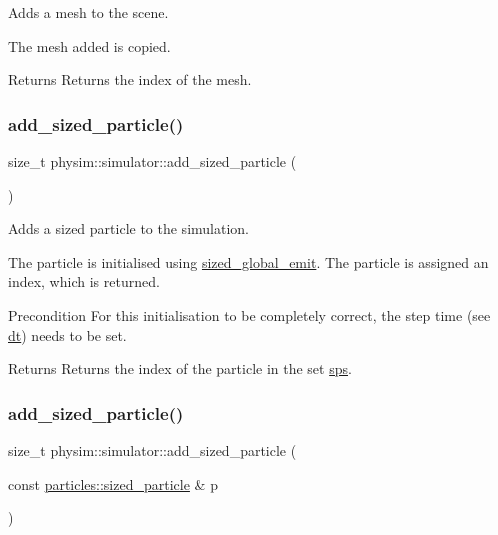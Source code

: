 Adds a mesh to the scene. 

The mesh added is copied. \begin{DoxyReturn}{Returns}
Returns the index of the mesh. 
\end{DoxyReturn}
\mbox{\label{classphysim_1_1simulator_ae36d99f98f5e470934eea0523ffca583}} 
\subsubsection{\texorpdfstring{add\+\_\+sized\+\_\+particle()}{add\_sized\_particle()}\hspace{0.1cm}{\footnotesize\ttfamily [1/2]}}
{\footnotesize\ttfamily size\+\_\+t physim\+::simulator\+::add\+\_\+sized\+\_\+particle (\begin{DoxyParamCaption}{ }\end{DoxyParamCaption})}



Adds a sized particle to the simulation. 

The particle is initialised using \hyperlink{classphysim_1_1simulator_a61d4f20480309e95fce1db56b7fc8a88}{sized\+\_\+global\+\_\+emit}. The particle is assigned an index, which is returned. \begin{DoxyPrecond}{Precondition}
For this initialisation to be completely correct, the step time (see \hyperlink{classphysim_1_1simulator_a12a60d0ed819937b51ce50162dbdd6e1}{dt}) needs to be set. 
\end{DoxyPrecond}
\begin{DoxyReturn}{Returns}
Returns the index of the particle in the set \hyperlink{classphysim_1_1simulator_ad3bc00314e9fd8435125ff1225c0658b}{sps}. 
\end{DoxyReturn}
\mbox{\label{classphysim_1_1simulator_aa7b066130ec71e7f8985ebc94605cf3b}} 
\subsubsection{\texorpdfstring{add\+\_\+sized\+\_\+particle()}{add\_sized\_particle()}\hspace{0.1cm}{\footnotesize\ttfamily [2/2]}}
{\footnotesize\ttfamily size\+\_\+t physim\+::simulator\+::add\+\_\+sized\+\_\+particle (\begin{DoxyParamCaption}\item[{const \hyperlink{classphysim_1_1particles_1_1sized__particle}{particles\+::sized\+\_\+particle} \&}]{p }\end{DoxyParamCaption})}



